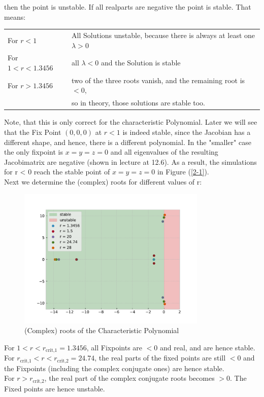 \documentclass{article}
\begin{document}
then the point is unstable. If all realparts are negative the point is stable.
That means:
\begin{table}[H]
    \centering
    \begin{tabular}{ll}
    For $ r < 1 $ & All Solutions unstable, because there is always at least
    one \( \lambda > 0 \) \\ 
    For $ 1 < r < 1.3456 $ & all \( \lambda < 0 \) and the Solution is stable \\
    For $ r > 1.3456 $ & two of the three roots vanish, and the remaining root
    is $ < 0 $, \\ & so in theory, those solutions are stable too.
    \end{tabular}
\end{table}
Note, that this is only correct for the characteristic Polynomial. Later we will
see that the Fix Point \( (0,0,0) \) at \( r < 1 \) is indeed stable, since
the Jacobian has a different shape, and hence, there is a different polynomial.
In the "smaller" case the only fixpoint is $x=y=z=0$ and all eigenvalues of
the resulting Jacobimatrix are negative (shown in
lecture at 12.6). As a result, the simulations for r < 0 reach the
stable point of $x=y=z=0$ in Figure (\ref{2-1}). \\[.5cm]

Next we determine the (complex) roots for different values of r:
\begin{figure}[H]
    \centering
    \includegraphics[width=9cm]{Figure1-2.pdf} 
    \caption{(Complex) roots of the Characteristic Polynomial} 
\end{figure}
For \( 1 < r < r_\text{crit,1} = 1.3456 \), all Fixpoints are \( < 0 \) and real,
and are hence stable.\\
For \(  r_\text{crit,1} < r < r_\text{crit,2} = 24.74\), the real parts of the
fixed points are still \( < 0 \) and the Fixpoints (including the complex
conjugate ones) are hence stable. \\
For \( r > r_\text{crit,2} \), the real part of the complex conjugate roots
becomes \( > 0 \). The Fixed points are hence unstable. \\
\end{document}
